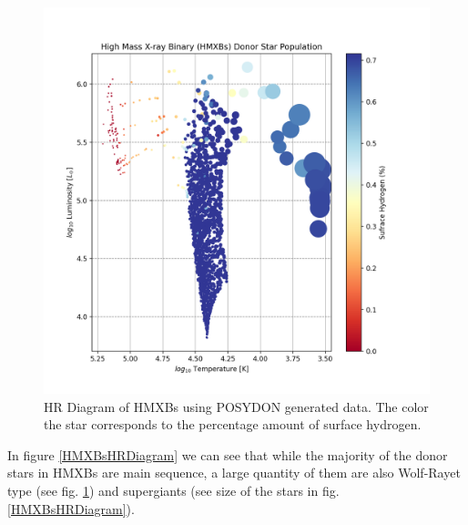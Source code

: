\documentclass[12pt, a4paper]{article}
\begin{document}
        \begin{figure}[H] 
            \centering
            \includegraphics[scale = .4]{figs/GeneratedFigs/VelaX-1/HMXBsSurfaceCompHRDiagram.png}
            \caption{HR Diagram of HMXBs using POSYDON generated data. The color the star corresponds to the percentage amount of surface hydrogen.}
            \label{HMXBsSurfaceCompHRDiagram}
        \end{figure}

        In figure \ref{HMXBsHRDiagram} we can see that while the majority of the donor stars in HMXBs are main sequence, a large quantity of them are also Wolf-Rayet type (see fig. \ref{HMXBsSurfaceCompHRDiagram}) and supergiants (see size of the stars in fig. \ref{HMXBsHRDiagram}).  
\end{document}
